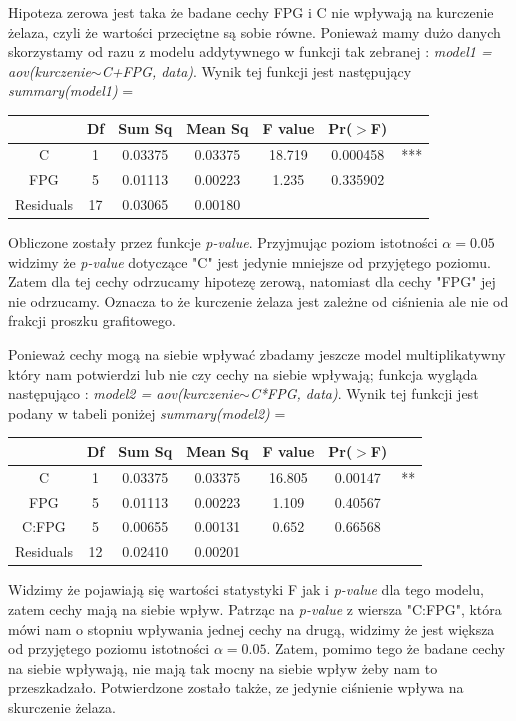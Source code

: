 \documentclass{article}
\begin{document}
Hipoteza zerowa jest taka że badane cechy FPG i C nie wpływają na kurczenie żelaza, czyli że wartości przeciętne są sobie równe. Ponieważ mamy dużo danych skorzystamy od razu z modelu addytywnego w funkcji tak zebranej : \textit{model1 = aov(kurczenie$\sim$C+FPG, data)}. Wynik tej funkcji jest następujący \textit{summary(model1)} = 
\begin{center} \begin{tabular}{|c|c|c|c|c|c|c|} \hline
& Df & Sum Sq & Mean Sq & F value & Pr($>$F) & \\ \hline
C & 1 & 0.03375 & 0.03375 & 18.719 & 0.000458 & *** \\ \hline
FPG & 5 & 0.01113 & 0.00223 & 1.235 & 0.335902 & \\ \hline
Residuals & 17 & 0.03065 & 0.00180 & & & \\ \hline
\end{tabular} \end{center}
Obliczone zostały przez funkcje \textit{p-value}. Przyjmując poziom istotności $\alpha = 0.05$ widzimy że \textit{p-value} dotyczące "C" jest jedynie mniejsze od przyjętego poziomu. Zatem dla tej cechy odrzucamy hipotezę zerową, natomiast dla cechy "FPG" jej nie odrzucamy. Oznacza to że kurczenie żelaza jest zależne od ciśnienia ale nie od frakcji proszku grafitowego. \\ \par

Ponieważ cechy mogą na siebie wpływać zbadamy jeszcze model multiplikatywny który nam potwierdzi lub nie czy cechy na siebie wpływają; funkcja wygląda następująco : \textit{model2 = aov(kurczenie$\sim$C*FPG, data)}. Wynik tej funkcji jest podany w tabeli poniżej \textit{summary(model2)} = 
\begin{center} \begin{tabular}{|c|c|c|c|c|c|c|} \hline
& Df & Sum Sq & Mean Sq & F value & Pr($>$F) & \\ \hline
C & 1 & 0.03375 & 0.03375 & 16.805 & 0.00147 & ** \\ \hline
FPG & 5 & 0.01113 & 0.00223 & 1.109 & 0.40567 & \\ \hline
C:FPG & 5 & 0.00655 & 0.00131 & 0.652 & 0.66568 & \\ \hline
Residuals & 12 & 0.02410 & 0.00201 & & & \\ \hline
\end{tabular} \end{center}
Widzimy że pojawiają się wartości statystyki F jak i \textit{p-value} dla tego modelu, zatem cechy mają na siebie wpływ. Patrząc na \textit{p-value} z wiersza "C:FPG", która mówi nam o stopniu wpływania jednej cechy na drugą, widzimy że jest większa od przyjętego poziomu istotności $\alpha = 0.05$. Zatem, pomimo tego że badane cechy na siebie wpływają, nie mają tak mocny na siebie wpływ żeby nam to przeszkadzało. Potwierdzone zostało także, ze jedynie ciśnienie wpływa na skurczenie żelaza.
\end{document}

